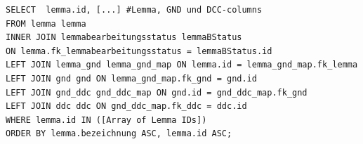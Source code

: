 \lstset{language=SQL}
\begin{lstlisting}[frame=single, label={lst:sqlQuery}, caption=Abfrage aller Lemmata mit den Buchstaben S (Part 2),captionpos=b] 
SELECT  lemma.id, [...] #Lemma, GND und DCC-columns        
FROM lemma lemma
INNER JOIN lemmabearbeitungsstatus lemmaBStatus
ON lemma.fk_lemmabearbeitungsstatus = lemmaBStatus.id
LEFT JOIN lemma_gnd lemma_gnd_map ON lemma.id = lemma_gnd_map.fk_lemma
LEFT JOIN gnd gnd ON lemma_gnd_map.fk_gnd = gnd.id
LEFT JOIN gnd_ddc gnd_ddc_map ON gnd.id = gnd_ddc_map.fk_gnd
LEFT JOIN ddc ddc ON gnd_ddc_map.fk_ddc = ddc.id
WHERE lemma.id IN ([Array of Lemma IDs])
ORDER BY lemma.bezeichnung ASC, lemma.id ASC;

\end{lstlisting}